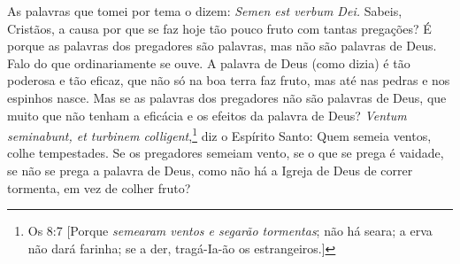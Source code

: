 As palavras que tomei por tema o dizem: \emph{Semen est verbum Dei.}
Sabeis, Cristãos, a causa por que se faz hoje tão pouco fruto com tantas
pregações? É porque as palavras dos pregadores são palavras, mas
não são palavras de Deus. Falo do que ordinariamente se ouve. A palavra
de Deus (como dizia) é tão poderosa e tão eficaz, que não só na boa
terra faz fruto, mas até nas pedras e nos espinhos nasce. Mas se as
palavras dos pregadores não são palavras de Deus, que muito que não
tenham a eficácia e os efeitos da palavra de Deus? \emph{Ventum
seminabunt, et turbinem colligent},\footnote{Os 8:7 [Porque \emph{semearam ventos e segarão tormentas}; não há seara; a erva não dará farinha; se a
der, tragá-Ia-ão os estrangeiros.]} diz o Espírito Santo: Quem
semeia ventos, colhe tempestades. Se os pregadores semeiam vento, se o
que se prega é vaidade, se não se prega a palavra de Deus, como não há a
Igreja de Deus de correr tormenta, em vez de colher fruto?


